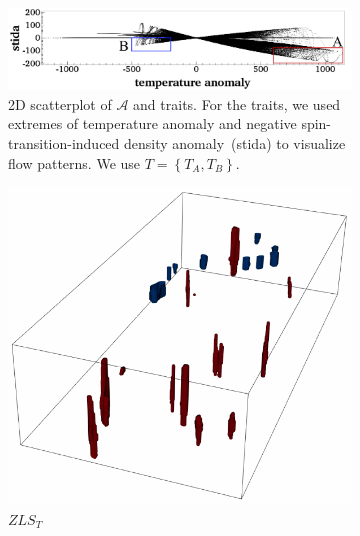 \begin{figure}[!h]
\begin{subfigure}{0.295\linewidth}
\centering
\includegraphics[width=\linewidth]{Images/Mantel/scatterplot.pdf}
\caption{2D scatterplot of $\mathcal{A}$ and traits. For the traits, we used extremes of temperature anomaly and negative spin-transition-induced density anomaly~(stida) to visualize flow patterns. We use $T = \left\{T_{A}, T_{B}\right\}$.} 
\label{fig:mantel_scatterplot}
\end{subfigure}
\hfill
\begin{subfigure}{0.195\linewidth}
\centering
\includegraphics[width=\linewidth]{Images/Mantel/zls.pdf}
\vspace{-3mm}
\caption{$ZLS_{T}$}
\label{fig:mantel_zls}
\end{subfigure}
\begin{subfigure}{0.195\linewidth}
\centering

\end{subfigure}
\end{figure}
